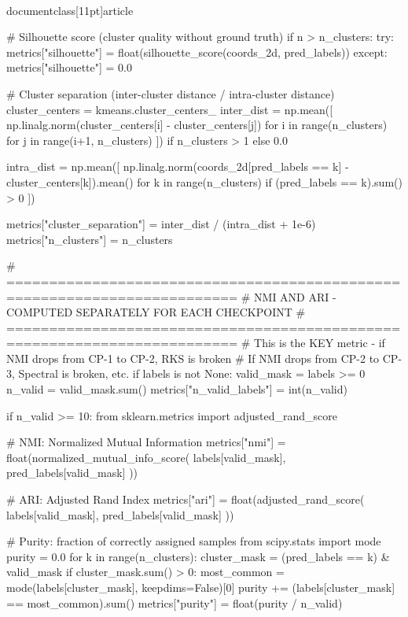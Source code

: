 \\documentclass[11pt]{article}
\begin{document}
\begin{CodeBlock}
    # Silhouette score (cluster quality without ground truth)
    if n > n_clusters:
        try:
            metrics["silhouette"] = float(silhouette_score(coords_2d, pred_labels))
        except:
            metrics["silhouette"] = 0.0

    # Cluster separation (inter-cluster distance / intra-cluster distance)
    cluster_centers = kmeans.cluster_centers_
    inter_dist = np.mean([
        np.linalg.norm(cluster_centers[i] - cluster_centers[j])
        for i in range(n_clusters)
        for j in range(i+1, n_clusters)
    ]) if n_clusters > 1 else 0.0

    intra_dist = np.mean([
        np.linalg.norm(coords_2d[pred_labels == k] - cluster_centers[k]).mean()
        for k in range(n_clusters)
        if (pred_labels == k).sum() > 0
    ])

    metrics["cluster_separation"] = inter_dist / (intra_dist + 1e-6)
    metrics["n_clusters"] = n_clusters

    # =========================================================================
    # NMI AND ARI - COMPUTED SEPARATELY FOR EACH CHECKPOINT
    # =========================================================================
    # This is the KEY metric - if NMI drops from CP-1 to CP-2, RKS is broken
    # If NMI drops from CP-2 to CP-3, Spectral is broken, etc.
    if labels is not None:
        valid_mask = labels >= 0
        n_valid = valid_mask.sum()
        metrics["n_valid_labels"] = int(n_valid)

        if n_valid >= 10:
            from sklearn.metrics import adjusted_rand_score

            # NMI: Normalized Mutual Information
            metrics["nmi"] = float(normalized_mutual_info_score(
                labels[valid_mask], pred_labels[valid_mask]
            ))

            # ARI: Adjusted Rand Index
            metrics["ari"] = float(adjusted_rand_score(
                labels[valid_mask], pred_labels[valid_mask]
            ))

            # Purity: fraction of correctly assigned samples
            from scipy.stats import mode
            purity = 0.0
            for k in range(n_clusters):
                cluster_mask = (pred_labels == k) & valid_mask
                if cluster_mask.sum() > 0:
                    most_common = mode(labels[cluster_mask], keepdims=False)[0]
                    purity += (labels[cluster_mask] == most_common).sum()
            metrics["purity"] = float(purity / n_valid)


\end{CodeBlock}
\end{document}
